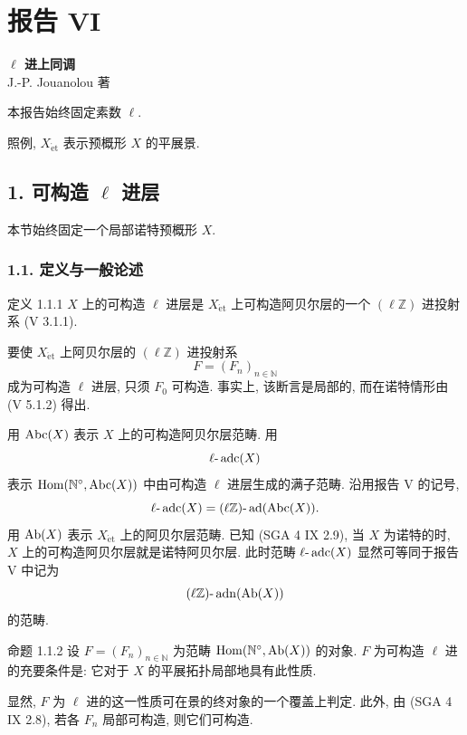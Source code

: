 \section*{报告 VI}

\begin{center}
\textbf{\(\ell\) 进上同调}\\[0.5em]
J.-P. Jouanolou 著
\end{center}

本报告始终固定素数 \(\ell\).

照例, \(X_{\mathrm{\acute et}}\) 表示预概形 \(X\) 的平展景.

\subsection*{1. 可构造 \(\ell\) 进层}

本节始终固定一个局部诺特预概形 \(X\).

\subsubsection*{1.1. 定义与一般论述}

\begin{statement}{定义 1.1.1}
\(X\) 上的可构造 \(\ell\) 进层是 \(X_{\mathrm{\acute et}}\) 上可构造阿贝尔层的一个 \((\ell\mathbb Z)\) 进投射系 (V 3.1.1).
\end{statement}

要使 \(X_{\mathrm{\acute et}}\) 上阿贝尔层的 \((\ell\mathbb Z)\) 进投射系
\[
F=(F_n)_{n\in\mathbb N}
\]
成为可构造 \(\ell\) 进层, 只须 \(F_0\) 可构造. 事实上, 该断言是局部的, 而在诺特情形由 (V 5.1.2) 得出.

用 \(\operatorname{Abc}(X)\) 表示 \(X\) 上的可构造阿贝尔层范畴. 用
\[
\ell\text{-}\operatorname{adc}(X)
\]
表示 \(\operatorname{Hom}(\mathbb N^\circ,\operatorname{Abc}(X))\) 中由可构造 \(\ell\) 进层生成的满子范畴. 沿用报告 V 的记号,
\[
\ell\text{-}\operatorname{adc}(X)=(\ell\mathbb Z)\text{-}\operatorname{ad}(\operatorname{Abc}(X)).
\]
用 \(\operatorname{Ab}(X)\) 表示 \(X_{\mathrm{\acute et}}\) 上的阿贝尔层范畴. 已知 (SGA 4 IX 2.9), 当 \(X\) 为诺特的时, \(X\) 上的可构造阿贝尔层就是诺特阿贝尔层. 此时范畴 \(\ell\text{-}\operatorname{adc}(X)\) 显然可等同于报告 V 中记为
\[
(\ell\mathbb Z)\text{-}\operatorname{adn}(\operatorname{Ab}(X))
\]
的范畴.

\begin{statement}{命题 1.1.2}
设 \(F=(F_n)_{n\in\mathbb N}\) 为范畴 \(\operatorname{Hom}(\mathbb N^\circ,\operatorname{Ab}(X))\) 的对象. \(F\) 为可构造 \(\ell\) 进的充要条件是: 它对于 \(X\) 的平展拓扑局部地具有此性质.
\end{statement}

\begin{prooftext}[证明]
显然, \(F\) 为 \(\ell\) 进的这一性质可在景的终对象的一个覆盖上判定. 此外, 由 (SGA 4 IX 2.8), 若各 \(F_n\) 局部可构造, 则它们可构造.
\end{prooftext}


